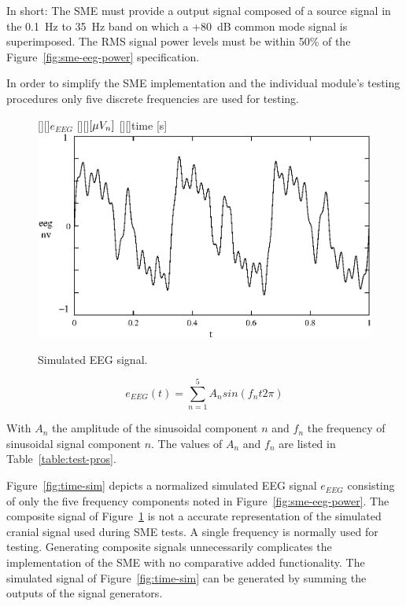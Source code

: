 In short: The SME must provide a output signal composed of a source
signal in the 0.1~Hz to 35~Hz band on which a +80~dB common mode
signal is superimposed. The RMS signal power levels must be within
50\% of the Figure~\ref{fig:sme-eeg-power} specification. 

In order to simplify the SME implementation and the individual
module's testing procedures only five discrete frequencies are used
for testing.

\begin{figure}[htbp]
\begin{center}
	[][]{$e_{EEG}$}
	[][]{$[\mu\/V_n]$}
	[][]{time [s]}												
	\includegraphics[width=\textwidth]{time-sim.eps}
    \caption{Simulated EEG signal.}
    \label{fig:time-sim}
\end{center}
\end{figure}

\begin{equation} \label{eq:time-sim}
	e_{EEG}(t) = \sum_{n=1}^5 A_{n}sin(f_{n}t2\pi)
\end{equation}

With $A_n$ the amplitude of the sinusoidal component $n$ and $f_n$ the
frequency of sinusoidal signal component $n$. The values of $A_n$ and
$f_n$ are listed in Table~\vref{table:test-pros}.


Figure~\vref{fig:time-sim} depicts a normalized simulated EEG signal
$e_{EEG}$ consisting of only the five frequency components noted in
Figure~\vref{fig:sme-eeg-power}. The composite signal of
Figure~\ref{fig:time-sim} is not a accurate representation of the
simulated cranial signal used during SME tests. A single frequency is
normally used for testing. Generating composite signals unnecessarily
complicates the implementation of the SME with no comparative added
functionality. The simulated signal of Figure~\vref{fig:time-sim} can
be generated by summing the outputs of the signal generators. 


